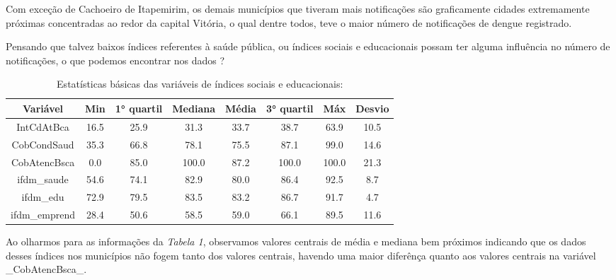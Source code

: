 \documentclass[12pt,a4paper]{article}\usepackage[]{graphicx}\usepackage[]{color}
\begin{document}
Com exceção de Cachoeiro de Itapemirim, os demais municípios que tiveram mais notificações são graficamente cidades extremamente próximas concentradas ao redor da capital Vitória, o qual dentre todos, teve o maior número de notificações de dengue registrado.

Pensando que talvez baixos índices referentes à saúde pública, ou índices sociais e educacionais possam ter alguma influência no número de notificações, o que podemos encontrar nos dados ?


\begin{table}[H]
\caption{Estatísticas básicas das variáveis de índices sociais e educacionais:}
\begin{center}
\begin{tabular}{cc|c|c|c|c|c|c}
\hline
\multicolumn{1}{c|}{Variável}     & Min  & 1° quartil & Mediana & Média & 3° quartil & Máx   & Desvio \\ \hline
\multicolumn{1}{c|}{IntCdAtBca}   & 16.5 & 25.9       & 31.3    & 33.7  & 38.7       & 63.9  & 10.5   \\
\multicolumn{1}{c|}{CobCondSaud}  & 35.3 & 66.8       & 78.1    & 75.5  & 87.1       & 99.0  & 14.6   \\
\multicolumn{1}{c|}{CobAtencBsca} & 0.0  & 85.0       & 100.0   & 87.2  & 100.0      & 100.0 & 21.3   \\
\multicolumn{1}{c|}{ifdm\_saude}  & 54.6 & 74.1       & 82.9    & 80.0  & 86.4       & 92.5  & 8.7    \\
\multicolumn{1}{c|}{ifdm\_edu}    & 72.9 & 79.5       & 83.5    & 83.2  & 86.7       & 91.7  & 4.7    \\
\multicolumn{1}{c|}{ifdm\_emprend}                    & 28.4 & 50.6       & 58.5    & 59.0  & 66.1       & 89.5  & 11.6   \\ \cline{1-8} 
\end{tabular}
\end{center}
\end{table}

Ao olharmos para as informações da \emph{Tabela 1}, observamos valores centrais de média e mediana bem próximos indicando que os dados desses índices nos municípios não fogem tanto dos valores centrais, havendo uma maior diferênça quanto aos valores centrais na variável \_CobAtencBsca\_.
\end{document}
